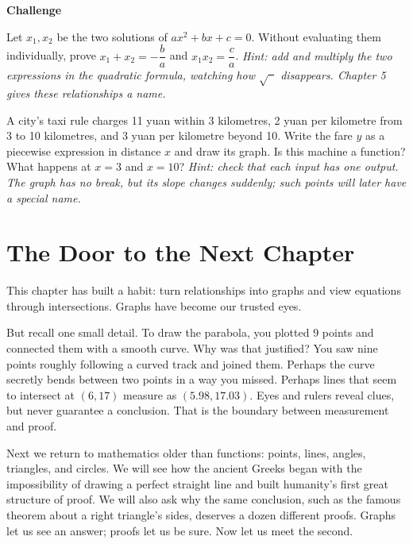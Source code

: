 \textbf{Challenge}
\begin{sikao}
\item Let $x_1,x_2$ be the two solutions of $ax^2 + bx + c = 0$. Without evaluating them individually, prove $x_1 + x_2 = -\dfrac{b}{a}$ and $x_1 x_2 = \dfrac{c}{a}$. \emph{Hint: add and multiply the two expressions in the quadratic formula, watching how $\sqrt{\phantom{a}}$ disappears. Chapter 5 gives these relationships a name.}
\item A city's taxi rule charges 11 yuan within 3 kilometres, 2 yuan per kilometre from 3 to 10 kilometres, and 3 yuan per kilometre beyond 10. Write the fare $y$ as a piecewise expression in distance $x$ and draw its graph. Is this machine a function? What happens at $x = 3$ and $x = 10$? \emph{Hint: check that each input has one output. The graph has no break, but its slope changes suddenly; such points will later have a special name.}
\end{sikao}

\section*{The Door to the Next Chapter}

This chapter has built a habit: turn relationships into graphs and view equations through intersections. Graphs have become our trusted eyes.

But recall one small detail. To draw the parabola, you plotted 9 points and connected them with a smooth curve. Why was that justified? You saw nine points roughly following a curved track and joined them. Perhaps the curve secretly bends between two points in a way you missed. Perhaps lines that seem to intersect at $(6, 17)$ measure as $(5.98, 17.03)$. Eyes and rulers reveal clues, but never guarantee a conclusion. That is the boundary between measurement and proof.

Next we return to mathematics older than functions: points, lines, angles, triangles, and circles. We will see how the ancient Greeks began with the impossibility of drawing a perfect straight line and built humanity's first great structure of proof. We will also ask why the same conclusion, such as the famous theorem about a right triangle's sides, deserves a dozen different proofs. Graphs let us see an answer; proofs let us be sure. Now let us meet the second.

